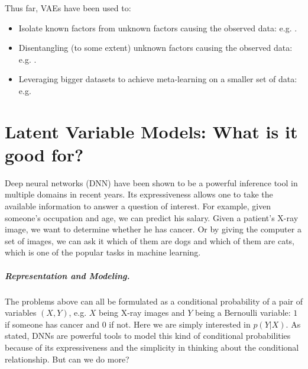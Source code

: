 \documentclass{article}
\begin{document}


Thus far, VAEs have been used to:
\begin{itemize}
\item Isolate known factors from unknown factors causing the observed data: e.g. \cite{kingma2014semi}.
\item Disentangling (to some extent) unknown factors causing the observed data: e.g. \cite{higgins2016beta}.
\item Leveraging bigger datasets to achieve meta-learning on a smaller set of data:  e.g. \cite{edwards2016towards}
\end{itemize}%





\section{Latent Variable Models: What is it good for?
}

Deep neural networks (DNN) have been shown to be a powerful inference tool in multiple domains in recent years. 
Its expressiveness allows one to take the available information to answer a question of interest. 
For example, given someone's occupation and age, we can predict his salary. 
Given a patient's X-ray image, we want to determine whether he has cancer. 
Or by giving the computer a set of images, we can ask it which of them are dogs and which of them are cats, which is one of the popular tasks in machine learning.

\subparagraph{Representation and Modeling.} 
The problems above can all be formulated as a conditional probability of a pair of variables $(X,Y)$, e.g. $X$ being X-ray images and $Y$ being a Bernoulli variable: $1$ if someone has cancer and $0$ if not. 
Here we are simply interested in $p(Y|X)$. 
As stated, DNNs are powerful tools to model this kind of conditional probabilities because of its expressiveness and the simplicity in thinking about the conditional relationship.
But can we do more?
\end{document}
